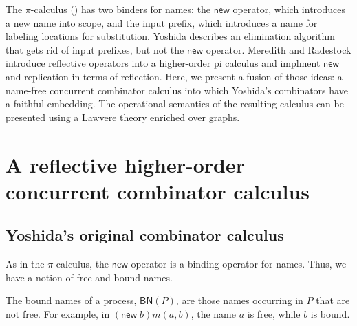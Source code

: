 \documentclass{llncs}
\newcommand{\new}{\mathsf{new}}
\newcommand{\pic}{$\pi$-calculus}
\newcommand{\pzero}{\mathbin{0}}
\newcommand{\freenames}[1]{\mathbin{\mathsf{FN}(#1)}}
\newcommand{\boundnames}[1]{\mathbin{\mathsf{BN}(#1)}}
\newcommand{\bc}{\mathbin{\mathbf{::=}}}
\newcommand{\bm}{\mathbin{\mathbf\mid}}
\begin{document}
The {\pic} (\cite{milner91polyadicpi}) has two binders for names: the
$\new$ operator, which introduces a new name into scope, and the input
prefix, which introduces a name for labeling locations for
substitution.  Yoshida \cite{DBLP:journals/tcs/Yoshida02} describes an
elimination algorithm that gets rid of input prefixes, but not the
$\new$ operator.  Meredith and Radestock
\cite{DBLP:journals/entcs/MeredithR05} introduce reflective operators
into a higher-order pi calculus and implment $\new$ and replication in
terms of reflection.  Here, we present a fusion of those ideas: a
name-free concurrent combinator calculus into which Yoshida's
combinators have a faithful embedding.  The operational semantics of
the resulting calculus can be presented using a Lawvere theory
enriched over graphs.

\section{A reflective higher-order concurrent combinator calculus}

\subsection{Yoshida's original combinator calculus}


As in the {\pic}, the $\new$ operator is a binding operator
for names. Thus, we have a notion of free and bound names.


The bound names of a process, $\boundnames{P}$, are those names occurring in $P$
that are not free. For example, in $(\new\; b)m(a,b)$, the name $a$ is free, while $b$ is bound.
\end{document}
